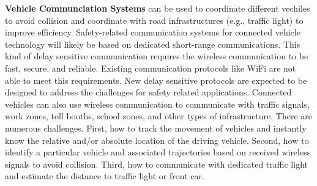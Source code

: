 \textbf{Vehicle Communciation Systems} can be used to 
coordinate different vechiles to avoid collision and 
coordinate with road infrastructures (e.g., traffic light)
to improve efficiency.
Safety-related communication systems for connected vehicle technology
will likely be based on dedicated 
short-range communications. 
This kind of delay sensitive communication requires
the wireless communication to be fast, secure, and reliable. 
Existing communication protocols like WiFi are not able
to meet this requirements. 
New delay sensitive protocols are expected to be designed to 
address the challenges for safety related applications. 
Connected vehicles can also use wireless communication to
communicate with traffic signals, work zones, toll booths, school zones,
and other types of infrastructure. 
There are numerous challenges. 
First, how to track the movement of vehicles
and instantly know the relative and/or absolute
location of the driving vehicle. 
Second, how to identify a particular vehicle
and associated trajectories based on received
wireless signals to avoid collision. 
Third, how to communicate with dedicated traffic
light and estimate the distance to traffic
light or front car. 




